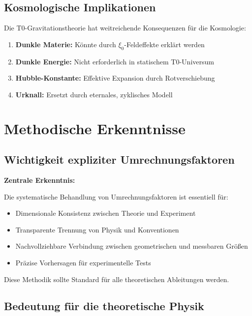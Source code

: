 \documentclass[12pt,a4paper]{article}
\begin{document}
	\subsection{Kosmologische Implikationen}
	
	Die T0-Gravitationstheorie hat weitreichende Konsequenzen für die Kosmologie:
	
	\begin{enumerate}
		\item \textbf{Dunkle Materie:} Könnte durch $\xi_0$-Feldeffekte erklärt werden
		\item \textbf{Dunkle Energie:} Nicht erforderlich in statischem T0-Universum
		\item \textbf{Hubble-Konstante:} Effektive Expansion durch Rotverschiebung
		\item \textbf{Urknall:} Ersetzt durch eternales, zyklisches Modell
	\end{enumerate}
	

	
	\section{Methodische Erkenntnisse}
	
	\subsection{Wichtigkeit expliziter Umrechnungsfaktoren}
	
	\begin{keyresult}
		\textbf{Zentrale Erkenntnis:}
		
		Die systematische Behandlung von Umrechnungsfaktoren ist essentiell für:
		\begin{itemize}
			\item Dimensionale Konsistenz zwischen Theorie und Experiment
			\item Transparente Trennung von Physik und Konventionen
			\item Nachvollziehbare Verbindung zwischen geometrischen und messbaren Größen
			\item Präzise Vorhersagen für experimentelle Tests
		\end{itemize}
		
		Diese Methodik sollte Standard für alle theoretischen Ableitungen werden.
	\end{keyresult}
	
	\subsection{Bedeutung für die theoretische Physik}
	
\end{document}

